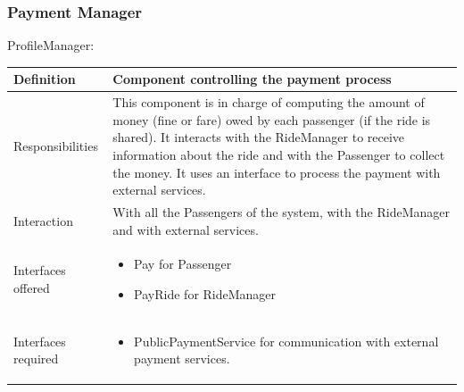 \documentclass[a4paper,11pt]{report} %
\begin{document}
	\subsubsection{Payment Manager}
	\begin{minipage}{\linewidth}
	\end{minipage}
	ProfileManager:
	\begin{center}
		\begin{tabular}{| l | p{9cm} |}\hline
			Definition & Component controlling the payment process\\\hline
			Responsibilities & This component is in charge of computing the amount of money (fine or fare) owed by each passenger (if the ride is shared). It interacts with the RideManager to receive information about the ride and with the Passenger to collect the money. It uses an interface to process the payment with external services.\\\hline
			Interaction & With all the Passengers of the system, with the RideManager and with external services.\\\hline
			Interfaces offered & \begin{itemize}
				\item Pay for Passenger
				\item PayRide for RideManager
			\end{itemize}\\\hline
			Interfaces required & \begin{itemize}
				\item PublicPaymentService for communication with external payment services.
			\end{itemize}\\\hline
		\end{tabular}
	\end{center}
\end{document}
